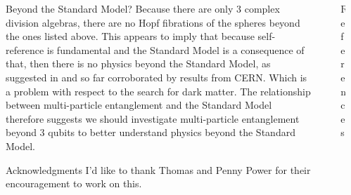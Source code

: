 \documentclass[final]{beamer}
\newlength{\sepwidth}
\newlength{\colwidth}
\newcommand{\separatorcolumn}{\begin{column}{\sepwidth}\end{column}}
\begin{document}
\begin{frame}[t]
\begin{columns}[t]
\begin{column}{\colwidth}
\begin{block}{Beyond the Standard Model?}
Because there are only 3 complex division algebras, there are no Hopf fibrations of the spheres beyond the ones listed above. This appears to imply that because self-reference is fundamental and the Standard Model is a consequence of that, then there is no physics beyond the Standard Model, as suggested in \autocite{small_2006} and so far corroborated by results from CERN. Which is a problem with respect to the search for dark matter. The relationship between multi-particle entanglement and the Standard Model therefore suggests we should investigate multi-particle entanglement beyond 3 qubits to better understand physics beyond the Standard Model.  
\end{block}
\begin{block}{Acknowledgments}
   I'd like to thank Thomas and Penny Power for their encouragement to work on this.
  \end{block}
\end{column}
\separatorcolumn
\begin{column}{\colwidth}
 
  \begin{block}{References}
    \printbibliography
  \end{block}

\end{column}

\separatorcolumn
\end{columns}
\end{frame}
\end{document}
